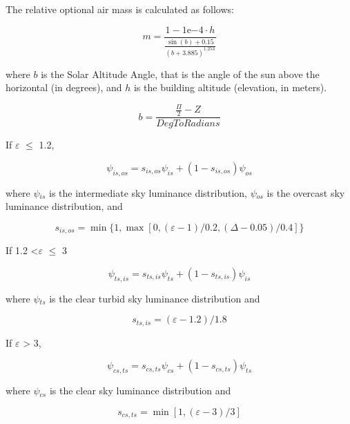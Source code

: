 The relative optional air mass is calculated as follows:

\begin{equation}
m = \frac{1- 1\mathrm{e}{-4}\cdot h}{\frac{\sin(b) + 0.15}{(b+3.885)^{1.253}}}
\end{equation}

where $b$ is the Solar Altitude Angle, that is the angle of the sun above the horizontal (in degrees), and $h$ is the building altitude (elevation, in meters).

\begin{equation}
b = \frac{\frac{\Pi}{2} - Z}{DegToRadians}
\end{equation}


If \emph{$\varepsilon$} $\leq$ 1.2,

\begin{equation}
{\psi_{is,os}} = {s_{is,os}}{\psi_{is}} + (1 - {s_{is,os}}){\psi_{os}}
\end{equation}

where \emph{$\psi$\(_{is}\)} is the intermediate sky luminance distribution, \emph{$\psi$\(_{os}\)} is the overcast sky luminance distribution, and

\begin{equation}
{s_{is,os}} = \min \{ 1,\max [0,(\varepsilon  - 1)/0.2,(\Delta  - 0.05)/0.4]\}
\end{equation}

If 1.2 \textless{}\emph{$\varepsilon$} $\leq$ 3

\begin{equation}
{\psi_{ts,is}} = {s_{ts,is}}{\psi_{ts}} + (1 - {s_{ts,is}}){\psi_{is}}
\end{equation}

where \emph{$\psi$\(_{ts}\)} is the clear turbid sky luminance distribution and

\begin{equation}
{s_{ts,is}} = (\varepsilon  - 1.2)/1.8
\end{equation}

If \emph{$\varepsilon$} \textgreater{} 3,

\begin{equation}
{\psi_{cs,ts}} = {s_{cs,ts}}{\psi_{cs}} + (1 - {s_{cs,ts}}){\psi_{ts}}
\end{equation}

where \emph{$\psi$\(_{cs}\)} is the clear sky luminance distribution and

\begin{equation}
{s_{cs,ts}} = \min [1,(\varepsilon  - 3)/3]
\end{equation}

